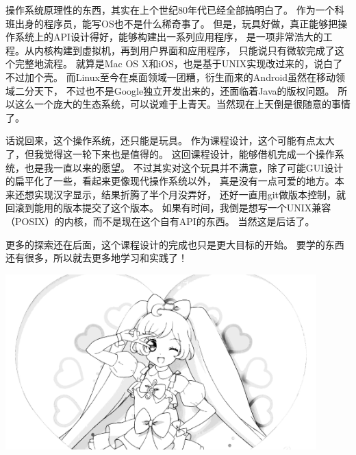 操作系统原理性的东西，其实在上个世纪80年代已经全部搞明白了。
作为一个科班出身的程序员，能写OS也不是什么稀奇事了。
但是，玩具好做，真正能够把操作系统上的API设计得好，能够构建出一系列应用程序，
是一项非常浩大的工程。从内核构建到虚拟机，再到用户界面和应用程序，
只能说只有微软完成了这个完整地流程。
就算是Mac OS X和iOS，也是基于UNIX实现改过来的，说白了不过加个壳。
而Linux至今在桌面领域一团糟，衍生而来的Android虽然在移动领域二分天下，
不过也不是Google独立开发出来的，还面临着Java的版权问题。
所以这么一个庞大的生态系统，可以说难于上青天。当然现在上天倒是很随意的事情了。

话说回来，这个操作系统，还只能是玩具。
作为课程设计，这个可能有点太大了，但我觉得这一轮下来也是值得的。
这回课程设计，能够借机完成一个操作系统，也是我一直以来的愿望。
不过其实对这个玩具并不满意，除了可能GUI设计的扁平化了一些，看起来更像现代操作系统以外，
真是没有一点可爱的地方。本来还想实现汉字显示，结果折腾了半个月没弄好，
还好一直用git做版本控制，就回滚到能用的版本提交了这个版本。
如果有时间，我倒是想写一个UNIX兼容（POSIX）的内核，而不是现在这个自有API的东西。
当然这是后话了。

更多的探索还在后面，这个课程设计的完成也只是更大目标的开始。
要学的东西还有很多，所以就去更多地学习和实践了！

\vfill

\centering
\includegraphics[width=12cm]{image/laala.png}

\vspace*{1cm}
